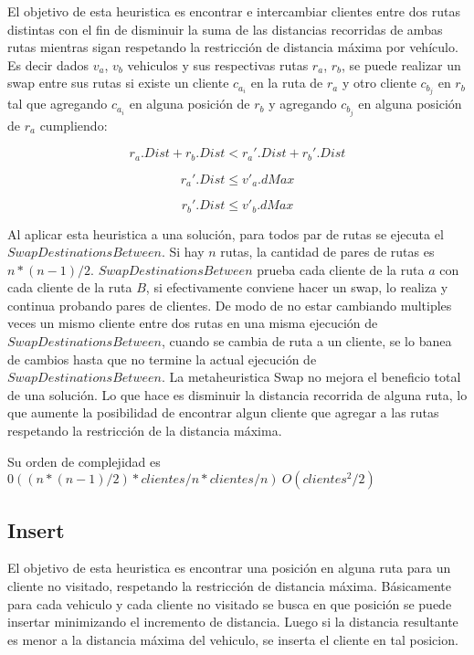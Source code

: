 El objetivo de esta heuristica es encontrar e intercambiar clientes entre dos rutas distintas con el fin de disminuir la suma de las distancias recorridas de ambas rutas mientras sigan respetando la restricción de distancia máxima por vehículo. Es decir dados $v_a$, $v_b$ vehiculos y sus respectivas rutas $r_a$, $r_b$, se puede realizar un swap entre sus rutas si existe un cliente $c_{a_i}$ en la ruta de $r_a$ y otro cliente $c_{b_j}$ en $r_b$ tal que agregando $c_{a_i}$ en alguna posición de $r_b$ y agregando $c_{b_j}$ en alguna posición de $r_a$ cumpliendo:

\begin{equation*}
r_a.Dist + r_b.Dist < r_a'.Dist + r_b'.Dist \nonumber
\end{equation*}

\begin{equation*}
r_a'.Dist \leq v'_a.dMax
\end{equation*}

\begin{equation*}
r_b'.Dist \leq v'_b.dMax
\end{equation*}

Al aplicar esta heuristica a una solución, para todos par de rutas se ejecuta el $SwapDestinationsBetween$. Si hay $n$ rutas, la cantidad de pares de rutas es $n * (n-1) / 2$. $SwapDestinationsBetween$ prueba cada cliente de la ruta $a$ con cada cliente de la ruta $B$, si efectivamente conviene hacer un swap, lo realiza y continua probando pares de clientes. De modo de no estar cambiando multiples veces un mismo cliente entre dos rutas en una misma ejecución de $SwapDestinationsBetween$, cuando se cambia de ruta a un cliente, se lo banea de cambios hasta que no termine la actual ejecución de $SwapDestinationsBetween$. La metaheuristica Swap no mejora el beneficio total de una solución. Lo que hace es disminuir la distancia recorrida de alguna ruta, lo que aumente la posibilidad de encontrar algun cliente que agregar a las rutas respetando la restricción de la distancia máxima.

\bigskip

Su orden de complejidad es $0((n * (n-1) / 2 ) * clientes/n * clientes/n) ~ O(clientes^2/2)$

\subsection{Insert}

El objetivo de esta heuristica es encontrar una posición en alguna ruta para un cliente no visitado, respetando la restricción de distancia máxima. Básicamente para cada vehiculo y cada cliente no visitado se busca en que posición se puede insertar minimizando el incremento de distancia. Luego si la distancia resultante es menor a la distancia máxima del vehiculo, se inserta el cliente en tal posicion.

